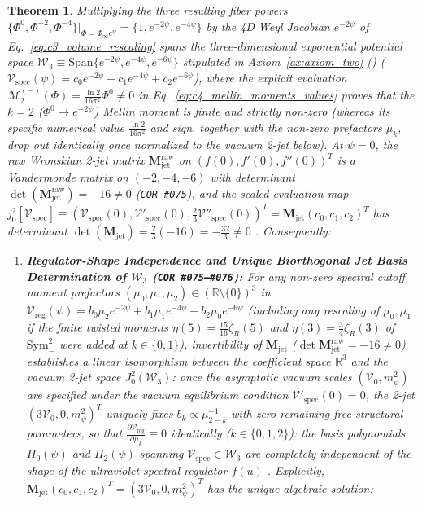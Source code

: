 \documentclass[11pt,a4paper]{article}
\newcommand{\catA}{\text{\textbf{\textcolor{purple!80!black}{[A]}}}}
\newcommand{\catD}{\text{\textbf{\textcolor{blue!75!black}{[D]}}}}
\theoremstyle{definition}
\theoremstyle{plain}
\newtheorem{theorem}[axiom]{Theorem}
\theoremstyle{remark}
\begin{document}
\begin{theorem}
Multiplying the three resulting fiber powers $\{\Phi^0, \Phi^{-2}, \Phi^{-4}\}\big|_{\Phi=\Phi_\infty e^\psi} = \{1, e^{-2\psi}, e^{-4\psi}\}$ by the 4D Weyl Jacobian $e^{-2\psi}$ of Eq.~\eqref{eq:c3_volume_rescaling} spans the three-dimensional exponential potential space $\mathcal{W}_3 \equiv \mathrm{Span}\{e^{-2\psi}, e^{-4\psi}, e^{-6\psi}\}$ stipulated in Axiom~\ref{ax:axiom_two} (\catA) ($\mathcal{V}_{\mathrm{spec}}(\psi) = c_0 e^{-2\psi} + c_1 e^{-4\psi} + c_2 e^{-6\psi}$), where the explicit evaluation $\mathcal{M}_2^{(-)}(\Phi) = \frac{\ln 2}{16\pi^2}\Phi^0 \neq 0$ in Eq.~\eqref{eq:c4_mellin_moments_values} proves that the $k = 2$ ($\Phi^0 \mapsto e^{-2\psi}$) Mellin moment is finite and strictly non-zero (whereas its specific numerical value $\frac{\ln 2}{16\pi^2}$ and sign, together with the non-zero prefactors $\mu_k$, drop out identically once normalized to the vacuum 2-jet below). At $\psi = 0$, the raw Wronskian 2-jet matrix $\mathbf{M}_{\mathrm{jet}}^{\mathrm{raw}}$ on $(f(0), f'(0), f''(0))^T$ is a Vandermonde matrix on $(-2, -4, -6)$ with determinant $\det(\mathbf{M}_{\mathrm{jet}}^{\mathrm{raw}}) = -16 \neq 0$ (\texttt{COR~\#075}), and the scaled evaluation map $j^2_0[\mathcal{V}_{\mathrm{spec}}] \equiv (\mathcal{V}_{\mathrm{spec}}(0), \mathcal{V}'_{\mathrm{spec}}(0), \frac{2}{3}\mathcal{V}''_{\mathrm{spec}}(0))^T = \mathbf{M}_{\mathrm{jet}}(c_0, c_1, c_2)^T$ has determinant $\det(\mathbf{M}_{\mathrm{jet}}) = \frac{2}{3}(-16) = -\frac{32}{3} \neq 0$ \catD. Consequently:
\begin{enumerate}[label=(\roman*)]
  \item \textbf{Regulator-Shape Independence and Unique Biorthogonal Jet Basis Determination of $\mathcal{W}_3$ (\texttt{COR~\#075--\#076}):}
  For any non-zero spectral cutoff moment prefactors $(\mu_0, \mu_1, \mu_2) \in (\mathbb{R}\setminus\{0\})^3$ in $\mathcal{V}_{\mathrm{reg}}(\psi) = b_0\mu_2 e^{-2\psi} + b_1\mu_1 e^{-4\psi} + b_2\mu_0 e^{-6\psi}$ (including any rescaling of $\mu_0, \mu_1$ if the finite twisted moments $\eta(5)=\frac{15}{16}\zeta_R(5)$ and $\eta(3)=\frac{3}{4}\zeta_R(3)$ of $\mathrm{Sym}^2_-$ were added at $k \in \{0,1\}$), invertibility of $\mathbf{M}_{\mathrm{jet}}$ ($\det\mathbf{M}_{\mathrm{jet}}^{\mathrm{raw}} = -16 \neq 0$) establishes a linear isomorphism between the coefficient space $\mathbb{R}^3$ and the vacuum 2-jet space $J^2_0(\mathcal{W}_3)$: once the asymptotic vacuum scales $(\mathcal{V}_0, m_\psi^2)$ are specified under the vacuum equilibrium condition $\mathcal{V}'_{\mathrm{spec}}(0) = 0$, the 2-jet $(3\mathcal{V}_0, 0, m_\psi^2)^T$ uniquely fixes $b_k \propto \mu_{2-k}^{-1}$ with zero remaining free structural parameters, so that $\frac{\partial\mathcal{V}_{\mathrm{reg}}}{\partial\mu_k} \equiv 0$ identically ($k \in \{0, 1, 2\}$): the basis polynomials $\Pi_0(\psi)$ and $\Pi_2(\psi)$ spanning $\mathcal{V}_{\mathrm{spec}} \in \mathcal{W}_3$ are completely independent of the shape of the ultraviolet spectral regulator $f(u)$ \catD. Explicitly, $\mathbf{M}_{\mathrm{jet}}(c_0, c_1, c_2)^T = (3\mathcal{V}_0, 0, m_\psi^2)^T$ has the unique algebraic solution:

\end{enumerate}
\end{theorem}
\end{document}

